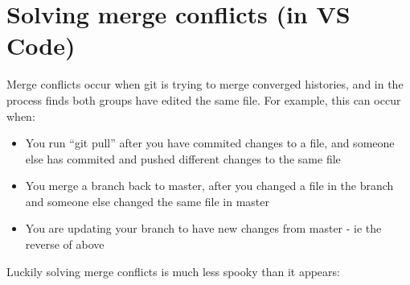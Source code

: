 \documentclass[11pt, titlepage]{article}
\begin{document}
\section{Solving merge conflicts (in VS Code)}
\label{sec:solving_merge_conflicts}
Merge conflicts occur when git is trying to merge converged histories, and in the process finds both groups have edited the same file. For example, this can occur when:
\begin{itemize}
	\item You run ``git pull'' after you have commited changes to a file, and someone else has commited and pushed different changes to the same file
	\item You merge a branch back to master, after you changed a file in the branch and someone else changed the same file in master
	\item You are updating your branch to have new changes from master - ie the reverse of above
\end{itemize}
Luckily solving merge conflicts is much less spooky than it appears:
\end{document}
